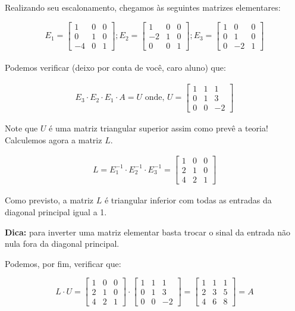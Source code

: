 \documentclass[12pt]{article}
\begin{document}
Realizando seu escalonamento, chegamos às seguintes matrizes elementares:

\begin{equation*}
	E_1=\begin{bmatrix}
		1 & 0 & 0\\
		0 & 1 & 0\\
		-4 & 0 & 1
	\end{bmatrix} ;
	E_2=
	\begin{bmatrix}
		1 & 0 & 0\\
		-2 & 1 & 0\\
		0 & 0 & 1
	\end{bmatrix};
	E_3=
	\begin{bmatrix}
		1 & 0 & 0\\
		0 & 1 & 0\\
		0 &-2 & 1
	\end{bmatrix}
\end{equation*}\\

Podemos verificar (deixo por conta de você, caro aluno) que:

\begin{align*}
	E_3\cdot E_2\cdot E_1\cdot A=U \mbox{ onde, }
	U=
	\begin{bmatrix}
		1 & 1 & 1\\
		0 & 1 & 3\\
		0 & 0 & -2
	\end{bmatrix}
\end{align*}	

Note que $U$ é uma matriz triangular superior assim como prevê a teoria! Calculemos agora a matriz $L$.

\begin{align}
	L=E_1^{-1}\cdot E_2^{-1}\cdot E_3^{-1}=
	\begin{bmatrix}
		1 & 0 & 0\\
		2 & 1 & 0\\
		4 & 2 & 1
	\end{bmatrix}
\end{align}

Como previsto, a matriz $L$ é triangular inferior com todas as entradas da diagonal principal igual a 1.

\textbf{Dica:} para inverter uma matriz elementar basta trocar o sinal da entrada não nula fora da diagonal principal. 

Podemos, por fim, verificar que:

\begin{equation*}
	L\cdot U=\begin{bmatrix}
		1 & 0 & 0\\
		2 & 1 & 0\\
		4 & 2 & 1
	\end{bmatrix}\cdot
	\begin{bmatrix}
		1 & 1 & 1\\
		0 & 1 & 3\\
		0 & 0 & -2
	\end{bmatrix}=
	\begin{bmatrix}
		1 & 1 & 1\\
		2 & 3 & 5\\
		4 & 6 & 8
	\end{bmatrix}=A
\end{equation*}
\end{document}
